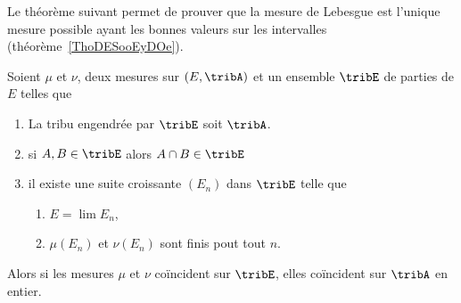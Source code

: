 Le théorème suivant permet de prouver que la mesure de Lebesgue est l'unique mesure possible ayant les bonnes valeurs sur les intervalles (théorème~\ref{ThoDESooEyDOe}).
\begin{theorem} \label{ThoJDYlsXu}
	Soient \( \mu\) et \( \nu\), deux mesures sur \( (E,\tribA)\) et un ensemble \( \tribE\) de parties de \( E\) telles que
	\begin{enumerate}
		\item
		      La tribu engendrée par \( \tribE\) soit \( \tribA\).
		\item
		      si \( A,B\in\tribE\) alors \( A\cap B\in\tribE\)
		\item
		      il existe une suite croissante \( (E_n)\) dans \( \tribE\) telle que
		      \begin{enumerate}
			      \item
			            \( E=\lim E_n\),
			      \item
			            \( \mu(E_n)\) et \( \nu(E_n)\) sont finis pout tout \( n\).
		      \end{enumerate}
	\end{enumerate}
	Alors si les mesures \( \mu\) et \( \nu\) coïncident sur \( \tribE\), elles coïncident sur \( \tribA\) en entier.
\end{theorem}

